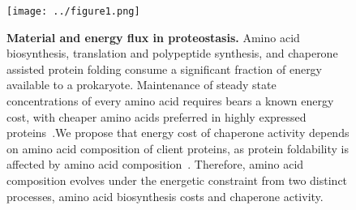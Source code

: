\documentclass[10pt,letterpaper]{article}
\begin{document}
\begin{figure}[h!]
\texttt{[image: ../figure1.png]}
\caption{
{\bf Material and energy flux in proteostasis.}  Amino acid biosynthesis, translation and polypeptide synthesis, and chaperone assisted protein folding consume a significant fraction of energy available to a prokaryote. Maintenance of steady state concentrations of every amino acid requires bears a known energy cost, with cheaper amino acids preferred in highly expressed proteins~\cite{Akashi2002Metabolic}.We propose that energy cost of chaperone activity depends on amino acid composition of client proteins, as protein foldability is affected by amino acid composition~\cite{Dill1985Theory,Berezovsky2007Positive,Venev2015Massively}. Therefore, amino acid composition evolves under the energetic constraint from two distinct processes, amino acid biosynthesis costs and chaperone activity.
}
\label{fig:fig1}
\end{figure}

\end{document}
